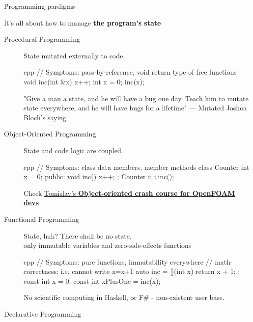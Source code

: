 \begin{frame}{Programming pardigms}

    It's all about how  to manage {\bf the program's state}

\begin{description}
    \item[Procedural Programming\hspace{2cm}] \hspace{\linewidth} 
        State mutated externally to code.
\begin{CodeEnvNoComment}{cpp}{\scriptsize}
// Symptoms: pass-by-reference, void return type of free functions
void inc(int &x) { x++; }
int x = 0;
inc(x);
\end{CodeEnvNoComment}
        "Give a man a state, and he will have a bug one day. Teach him to mutate state everywhere, and he will have bugs for a lifetime"
        --- Mutated Joshoa Bloch's saying
    \item[Object-Oriented Programming\hspace{2cm}] \hspace{\linewidth} 
        State and code logic are coupled.
\begin{CodeEnvNoComment}{cpp}{\scriptsize}
// Symptoms: class data members, member methods
class Counter {
    int x = 0;
public:
    void inc() { x++;}
};
Counter i;
i.inc();
\end{CodeEnvNoComment}
    Check \href{https://www.youtube.com/watch?v=F4fxlM5gmtU}{Tomislav's \bf Object-oriented crash course for OpenFOAM devs}
    \item[Functional Programming\hspace{2cm}] \hspace{\linewidth} 
        State, huh? There shall be no state,
        \\only immutable variables and zero-side-effects functions
\begin{CodeEnvNoComment}{cpp}{\scriptsize}
// Symptoms: pure functions, immutability everywhere
// math-correctness; i.e. cannot write x=x+1
auto inc = [](int x) { return x + 1; };
const int x = 0;
const int xPlusOne = inc(x);
\end{CodeEnvNoComment}
        No scientific computing in Haskell, or F\# - non-existent user base.
    \item[Declarative Programming\hspace{2cm}] \hspace{\linewidth} 

\end{description}
\end{frame}
